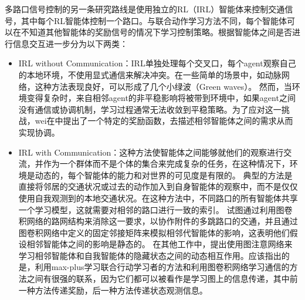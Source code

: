 多路口信号控制的另一条研究路线是使用独立的RL（IRL）智能体来控制交通信号，其中每个RL智能体控制一个路口。与联合动作学习方法不同，每个智能体可以在不知道其他智能体的奖励信号的情况下学习控制策略。根据智能体之间是否进行信息交互进一步分为以下两类：
\begin{itemize}
  \item IRL without Communication：IRL单独处理每个交叉口，每个agent观察自己的本地环境，不使用显式通信来解决冲突。在一些简单的场景中，如动脉网络，这种方法表现良好，可以形成了几个小绿波（Green waves）。
  然而，当环境变得复杂时，来自相邻agent的非平稳影响将被带到环境中，如果agent之间没有通信或协调机制，学习过程通常无法收敛到平稳策略。为了应对这一挑战，wei在中提出了一个特定的奖励函数，去描述相邻智能体之间的需求从而实现协调。
  
  \item IRL with Communication：这种方法使智能体之间能够就他们的观察进行交流，并作为一个群体而不是个体的集合来完成复杂的任务，在这种情况下，环境是动态的，每个智能体的能力和对世界的可见度是有限的。
  典型的方法是直接将邻居的交通状况或过去的动作加入到自身智能体的观察中，而不是仅仅使用自我观测到的本地交通状况。在这种方法中，不同路口的所有智能体共享一个学习模型，这就需要对相邻的路口进行一致的索引。
  试图通过利用图卷积网络的路网结构来消除这一要求，以协作附件的多跳路口的交通，并且通过图卷积网络中定义的固定邻接矩阵来模拟相邻代智能体的影响，这表明他们假设相邻智能体之间的影响是静态的。
  在其他工作中，提出使用图注意网络来学习相邻智能体和自我智能体的隐藏状态之间的动态相互作用。应该指出的是，利用max-plus学习联合行动学习者的方法和利用图卷积网络学习通信的方法之间有很强的联系，因为它们都可以被看作是学习图上的信息传递，其中前一种方法传递奖励，后一种方法传递状态观测信息。
\end{itemize}

